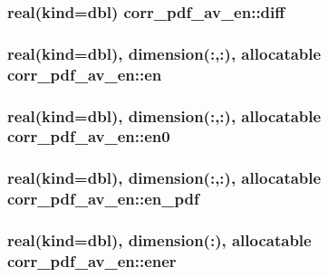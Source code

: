 \hypertarget{classcorr__pdf__av__en_a2b4a3e0059d00b4361b9080ed20bf2d9}{
\subsubsection[{diff}]{\setlength{\rightskip}{0pt plus 5cm}real(kind={\bf dbl}) corr\+\_\+pdf\+\_\+av\+\_\+en\+::diff}}\label{classcorr__pdf__av__en_a2b4a3e0059d00b4361b9080ed20bf2d9}
\hypertarget{classcorr__pdf__av__en_ad7740ba8e54476232cb2633bb401fa5a}{
\subsubsection[{en}]{\setlength{\rightskip}{0pt plus 5cm}real(kind={\bf dbl}), dimension(\+:,\+:), allocatable corr\+\_\+pdf\+\_\+av\+\_\+en\+::en}}\label{classcorr__pdf__av__en_ad7740ba8e54476232cb2633bb401fa5a}
\hypertarget{classcorr__pdf__av__en_aa800bbd510ba2115e28b65cc94fb2229}{
\subsubsection[{en0}]{\setlength{\rightskip}{0pt plus 5cm}real(kind={\bf dbl}), dimension(\+:,\+:), allocatable corr\+\_\+pdf\+\_\+av\+\_\+en\+::en0}}\label{classcorr__pdf__av__en_aa800bbd510ba2115e28b65cc94fb2229}
\hypertarget{classcorr__pdf__av__en_ad0a83d5fd5ca5145b33c5e6c0e3d83eb}{
\subsubsection[{en\+\_\+pdf}]{\setlength{\rightskip}{0pt plus 5cm}real(kind={\bf dbl}), dimension(\+:,\+:), allocatable corr\+\_\+pdf\+\_\+av\+\_\+en\+::en\+\_\+pdf}}\label{classcorr__pdf__av__en_ad0a83d5fd5ca5145b33c5e6c0e3d83eb}
\hypertarget{classcorr__pdf__av__en_a61ffc857d0af4035f445b991729edbb4}{
\subsubsection[{ener}]{\setlength{\rightskip}{0pt plus 5cm}real(kind={\bf dbl}), dimension(\+:), allocatable corr\+\_\+pdf\+\_\+av\+\_\+en\+::ener}}\label{classcorr__pdf__av__en_a61ffc857d0af4035f445b991729edbb4}
